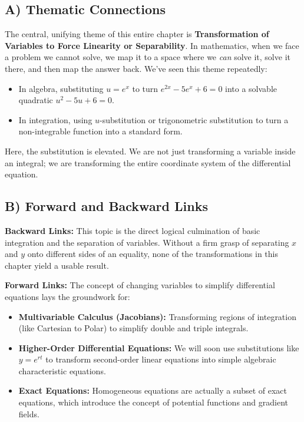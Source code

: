 \documentclass[11pt]{article}
\begin{document}
\subsection{A) Thematic Connections}
The central, unifying theme of this entire chapter is \textbf{Transformation of Variables to Force Linearity or Separability}. In mathematics, when we face a problem we cannot solve, we map it to a space where we \textit{can} solve it, solve it there, and then map the answer back. 
We've seen this theme repeatedly:
\begin{itemize}
    \item In algebra, substituting $u = e^x$ to turn $e^{2x} - 5e^x + 6 = 0$ into a solvable quadratic $u^2 - 5u + 6 = 0$.
    \item In integration, using $u$-substitution or trigonometric substitution to turn a non-integrable function into a standard form.
\end{itemize}
Here, the substitution is elevated. We are not just transforming a variable inside an integral; we are transforming the entire coordinate system of the differential equation. 

\subsection{B) Forward and Backward Links}
\textbf{Backward Links:} This topic is the direct logical culmination of basic integration and the separation of variables. Without a firm grasp of separating $x$ and $y$ onto different sides of an equality, none of the transformations in this chapter yield a usable result.

\textbf{Forward Links:} The concept of changing variables to simplify differential equations lays the groundwork for:
\begin{itemize}
    \item \textbf{Multivariable Calculus (Jacobians):} Transforming regions of integration (like Cartesian to Polar) to simplify double and triple integrals.
    \item \textbf{Higher-Order Differential Equations:} We will soon use substitutions like $y = e^{rt}$ to transform second-order linear equations into simple algebraic characteristic equations.
    \item \textbf{Exact Equations:} Homogeneous equations are actually a subset of exact equations, which introduce the concept of potential functions and gradient fields.
\end{itemize}
\end{document}
